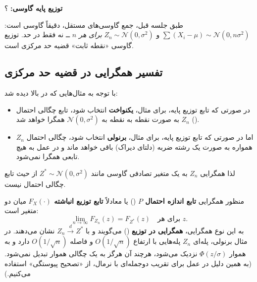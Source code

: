 \textbf{توزیع پایه گاوسی:} ؟

\begin{question}
\begin{answer}
طبق جلسه قبل، جمع گاوسی‌های مستقل، دقیقاً گاوسی است: $\sum(X_i-\mu)\sim\mathcal N(0,n\sigma^2)$ و $Z_n\sim\mathcal N(0,\sigma^2)$ \emph{برای هر $n$} ــ نه فقط در حد. توزیع گاوسی «نقطه ثابت» قضیه حد مرکزی است.
\end{answer}
\end{question}

\subsection{تفسیر همگرایی در قضیه حد مرکزی }
با توجه به مثال‌هایی که در بالا دیده شد:
\begin{itemize}
\item در صورتی که تابع توزیع پایه، برای مثال، \textbf{یکنواخت} انتخاب شود، تابع چگالی احتمال () $Z_n$ به صورت نقطه به نقطه به $\mathcal N(0,\sigma^2)$ همگرا خواهد شد.
\item اما در صورتی که تابع توزیع پایه، برای مثال، \textbf{برنولی} انتخاب شود، چگالی احتمال $Z_n$ همواره به صورت یک رشته ضربه (دلتای دیراک) باقی خواهد ماند و در عمل به هیچ تابعی همگرا نمی‌شود.
\end{itemize}
لذا همگرایی $Z_n$ به یک متغیر تصادفی گاوسی مانند $Z^*\sim\mathcal N(0,\sigma^2)$ از حیث \textcolor{blue!60!black}{تابع چگالی احتمال} \textcolor{red!70!black}{نیست}.

\begin{question}
\begin{answer}
منظور همگرایی \textbf{تابع اندازه احتمال $P$} () یا \textcolor{red!70!black}{معادلاً} \textbf{تابع توزیع انباشته $F_X(\cdot)$} میان دو متغیر است:
\[
\lim_{n\to\infty}F_{Z_n}(z)=F_{Z^*}(z)\quad\text{برای هر }z .
\]
به این نوع همگرایی، \textbf{همگرایی در توزیع} () می‌گویند و با $Z_n\xrightarrow{d}Z^*$ نشان می‌دهند. در مثال برنولی،  پله‌ای $Z_n$ پله‌هایی با ارتفاع $O(1/\sqrt n)$ و فاصله $O(1/\sqrt n)$ دارد و به  هموار $\Phi(z/\sigma)$ نزدیک می‌شود، هرچند  آن هرگز به یک چگالی هموار تبدیل نمی‌شود. (به همین دلیل در عمل برای تقریب دوجمله‌ای با نرمال، از «تصحیح پیوستگی» استفاده می‌کنیم.)
\end{answer}
\end{question}

